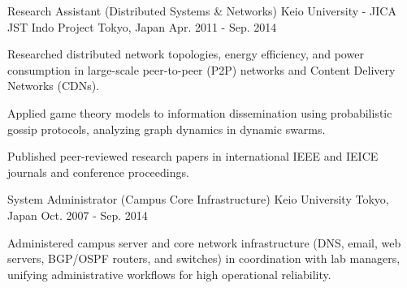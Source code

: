 \begin{cventries}
  \cventry
    {Research Assistant (Distributed Systems \& Networks)} %
    {Keio University - JICA JST Indo Project} %
    {Tokyo, Japan} %
    {Apr. 2011 - Sep. 2014} %
    {
      \begin{cvitems} %
        \item {Researched distributed network topologies, energy efficiency, and power consumption in large-scale peer-to-peer (P2P) networks and Content Delivery Networks (CDNs).}
        \item {Applied game theory models to information dissemination using probabilistic gossip protocols, analyzing graph dynamics in dynamic swarms.}
        \item {Published peer-reviewed research papers in international IEEE and IEICE journals and conference proceedings.}
      \end{cvitems}
    }

  \cventry
    {System Administrator (Campus Core Infrastructure)} %
    {Keio University} %
    {Tokyo, Japan} %
    {Oct. 2007 - Sep. 2014} %
    {
      \begin{cvitems} %
        \item {Administered campus server and core network infrastructure (DNS, email, web servers, BGP/OSPF routers, and switches) in coordination with lab managers, unifying administrative workflows for high operational reliability.}
      \end{cvitems}
    }

\end{cventries}
